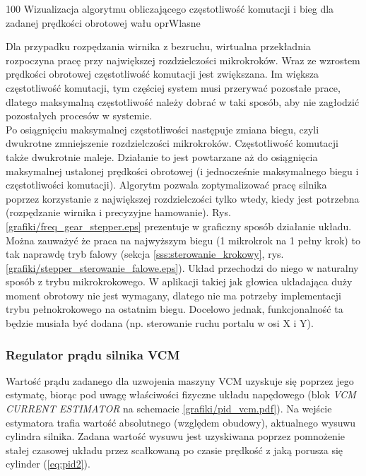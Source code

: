 	{100}
	{Wizualizacja algorytmu obliczającego częstotliwość komutacji i bieg dla zadanej prędkości obrotowej wału}
	{oprWlasne}

Dla przypadku rozpędzania wirnika z bezruchu, wirtualna przekładnia rozpoczyna pracę przy największej rozdzielczości mikrokroków. Wraz ze wzrostem prędkości obrotowej częstotliwość komutacji jest zwiększana. Im większa częstotliwość komutacji, tym częściej system musi przerywać pozostałe prace, dlatego maksymalną częstotliwość należy dobrać w taki sposób, aby nie zagłodzić pozostałych procesów w systemie. \\

Po osiągnięciu maksymalnej częstotliwości następuje zmiana biegu, czyli dwukrotne zmniejszenie rozdzielczości mikrokroków. Częstotliwość komutacji także dwukrotnie maleje. Działanie to jest powtarzane aż do osiągnięcia maksymalnej ustalonej prędkości obrotowej (i jednocześnie maksymalnego biegu i częstotliwości komutacji). Algorytm pozwala zoptymalizować pracę silnika poprzez korzystanie z największej rozdzielczości tylko wtedy, kiedy jest potrzebna (rozpędzanie wirnika i precyzyjne hamowanie). Rys. \ref{grafiki/freq_gear_stepper.eps} prezentuje w graficzny sposób działanie układu. \\

Można zauważyć że praca na najwyższym biegu (1 mikrokrok na 1 pełny krok) to tak naprawdę tryb falowy (sekcja \ref{sss:sterowanie_krokowy}, rys. \ref{grafiki/stepper_sterowanie_falowe.eps}). Układ przechodzi do niego w naturalny sposób z trybu mikrokrokowego. W aplikacji takiej jak głowica układająca duży moment obrotowy nie jest wymagany, dlatego nie ma potrzeby implementacji trybu pełnokrokowego na ostatnim biegu. Docelowo jednak, funkcjonalność ta będzie musiała być dodana (np. sterowanie ruchu portalu w osi X i Y).

\subsubsection{Regulator prądu silnika VCM}

Wartość prądu zadanego dla uzwojenia maszyny VCM uzyskuje się poprzez jego estymatę, biorąc pod uwagę właściwości fizyczne układu napędowego (blok {\it VCM CURRENT ESTIMATOR} na schemacie \ref{grafiki/pid_vcm.pdf}). Na wejście estymatora trafia wartość absolutnego (względem obudowy), aktualnego wysuwu cylindra silnika. Zadana wartość wysuwu jest uzyskiwana poprzez pomnożenie stałej czasowej układu przez scałkowaną po czasie prędkość z jaką porusza się cylinder (\ref{eq:pid2}).

